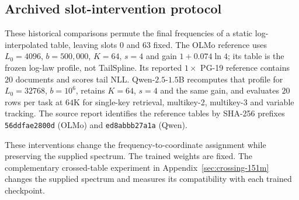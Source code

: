 \subsection{Archived slot-intervention protocol}
\label{sec:slot-protocol}
These historical comparisons permute the final frequencies of a static log-interpolated table, leaving slots $0$ and $63$ fixed. The OLMo reference uses $L_0=4096$, $b=500{,}000$, $K=64$, $s=4$ and gain $1+0.074\ln4$; its table is the frozen log-law profile, not TailSpline. Its reported $1\times$ PG-19 reference contains $20$ documents and scores tail NLL. Qwen-$2.5$-$1.5$B recomputes that profile for $L_0=32768$, $b=10^6$, retains $K=64$, $s=4$ and the same gain, and evaluates $20$ rows per task at $64$K for single-key retrieval, multikey-2, multikey-3 and variable tracking. The source report identifies the reference tables by SHA-256 prefixes \texttt{56ddfae2800d} (OLMo) and \texttt{ed8abbb27a1a} (Qwen).

These interventions change the frequency-to-coordinate assignment while
preserving the supplied spectrum. The trained weights are fixed. The
complementary crossed-table experiment in Appendix~\ref{sec:crossing-151m}
changes the supplied spectrum and measures its compatibility with each
trained checkpoint.
